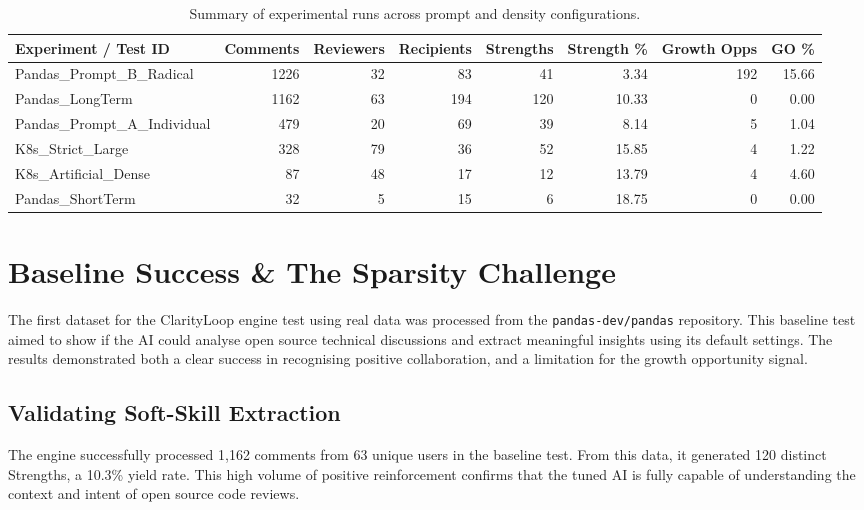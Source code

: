 \documentclass[conference]{IEEEconf}
\begin{document}
\begin{table}[!tbp]
\centering
\caption{Summary of experimental runs across prompt and density configurations.}
\label{tab:experiments}
\begin{tabular}{lrrrrrrr}
\toprule
\textbf{Experiment / Test ID} & \textbf{Comments} & \textbf{Reviewers} & \textbf{Recipients} & \textbf{Strengths} & \textbf{Strength \%} & \textbf{Growth Opps} & \textbf{GO \%} \\
\midrule
Pandas\_Prompt\_B\_Radical     & 1226 & 32 &  83 & 41  &  3.34 & 192 & 15.66 \\
Pandas\_LongTerm               & 1162 & 63 & 194 & 120 & 10.33 &   0 &  0.00 \\
Pandas\_Prompt\_A\_Individual  &  479 & 20 &  69 & 39  &  8.14 &   5 &  1.04 \\
K8s\_Strict\_Large             &  328 & 79 &  36 & 52  & 15.85 &   4 &  1.22 \\
K8s\_Artificial\_Dense         &   87 & 48 &  17 & 12  & 13.79 &   4 &  4.60 \\
Pandas\_ShortTerm              &   32 &  5 &  15 &  6  & 18.75 &   0 &  0.00 \\
\bottomrule
\end{tabular}
\end{table}

\section{Baseline Success \& The Sparsity Challenge}
The first dataset for the ClarityLoop engine test using real data was processed from the \texttt{pandas-dev/pandas} repository. This baseline test aimed to show if the AI could analyse open source technical discussions and extract meaningful insights using its default settings. The results demonstrated both a clear success in recognising positive collaboration, and a limitation for the growth opportunity signal.

\subsection{Validating Soft-Skill Extraction}
The engine successfully processed 1,162 comments from 63 unique users in the baseline test. From this data, it generated 120 distinct Strengths, a 10.3\% yield rate. This high volume of positive reinforcement confirms that the tuned AI is fully capable of understanding the context and intent of open source code reviews.
\end{document}
